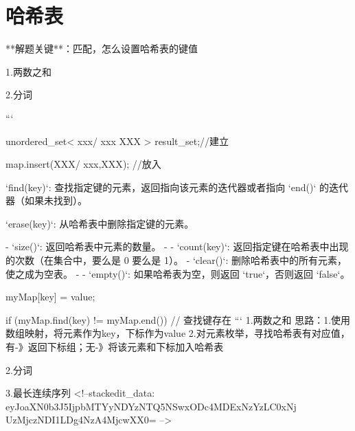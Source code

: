 \chapter{哈希表}

**解题关键**：匹配，怎么设置哈希表的键值


1.两数之和

2.分词

```

unordered_set< xxx/ xxx XXX > result_set;//建立

map.insert(XXX/ {xxx,XXX}); //放入

`find(key)`: 查找指定键的元素，返回指向该元素的迭代器或者指向 `end()` 的迭代器（如果未找到）。

`erase(key)`: 从哈希表中删除指定键的元素。

-   `size()`: 返回哈希表中元素的数量。
- -   `count(key)`: 返回指定键在哈希表中出现的次数（在集合中，要么是 0 要么是 1）。
-   `clear()`: 删除哈希表中的所有元素，使之成为空表。
- -   `empty()`: 如果哈希表为空，则返回 `true`，否则返回 `false`。

myMap[key] = value;

if (myMap.find(key) != myMap.end()) {
    // 查找键存在
}
```
1.两数之和
思路：1.使用数组映射，将元素作为key，下标作为value
2.对元素枚举，寻找哈希表有对应值，有-》返回下标组；无-》将该元素和下标加入哈希表

2.分词


3.最长连续序列
<!--stackedit_data:
eyJoaXN0b3J5IjpbMTYyNDYzNTQ5NSwxODc4MDExNzYzLC0xNj
UzMjczNDI1LDg4NzA4MjcwXX0=
-->